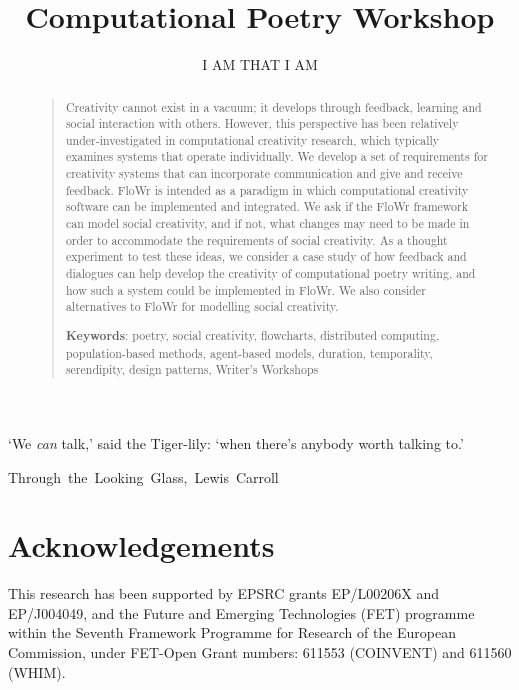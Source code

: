 \documentclass[letterpaper]{article}
\title{Computational Poetry Workshop}
\author{I AM THAT I AM}
\newcommand*{\sourceatright}[1]{\unskip\hspace{1em plus 1fill}%
\nolinebreak[3]\hspace*{\fill}\mbox{#1}}%
\begin{document}
 
\maketitle
\begin{abstract}
\begin{quote}
Creativity cannot exist in a vacuum; it develops through feedback,
learning and social interaction with others. However, this perspective
has been relatively under-investigated in computational creativity
research, which typically examines systems that operate
individually. We develop a set of requirements for creativity systems
that can incorporate communication and give and receive
feedback. FloWr is intended as a paradigm in which computational
creativity software can be implemented and integrated. We ask if the
FloWr framework can model social creativity, and if not, what changes
may need to be made in order to accommodate the requirements of social
creativity. As a thought experiment to test these ideas, we consider a
case study of how feedback and dialogues can help develop the
creativity of computational poetry writing, and how such a system
could be implemented in FloWr. We also consider alternatives to FloWr
for modelling social creativity.

\medskip

\textbf{Keywords}: poetry, social creativity, flowcharts,
distributed computing, population-based methods, agent-based models,
duration, temporality, serendipity, design patterns, Writer's Workshops
\end{quote}
\end{abstract}


{\small `We \emph{can} talk,' said the Tiger-lily: `when there's anybody worth talking to.'

\sourceatright{Through the Looking Glass, Lewis Carroll}}








\section*{Acknowledgements} \label{sec:acknowledgements}
This research has been supported by EPSRC grants EP/L00206X and
EP/J004049, and the Future and Emerging Technologies (FET) programme
within the Seventh Framework Programme for Research of the European
Commission, under FET-Open Grant numbers: 611553 (COINVENT) and 611560
(WHIM).


\printbibliography

% 
\end{document}
